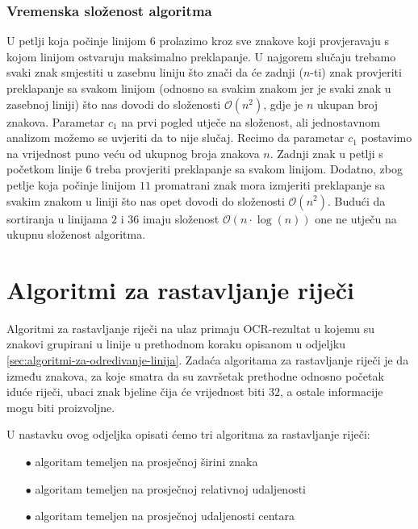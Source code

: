 \documentclass[times, utf8, zavrsni]{fer}
\begin{document}
\subsubsection{Vremenska složenost algoritma}
U petlji koja počinje linijom $6$ prolazimo kroz sve znakove koji provjeravaju
s kojom linijom ostvaruju maksimalno preklapanje. U najgorem slučaju trebamo
svaki znak smjestiti u zasebnu liniju što znači da će zadnji ($n$-ti) znak provjeriti preklapanje sa svakom linijom (odnosno sa svakim znakom jer je svaki znak u zasebnoj liniji) što nas dovodi do složenosti
$\mathcal{O}(n^2)$, gdje je $n$ ukupan broj znakova. Parametar $c_1$ na prvi
pogled utječe na složenost, ali jednostavnom analizom možemo se uvjeriti da to
nije slučaj. Recimo da parametar $c_1$ postavimo na vrijednost
puno veću od ukupnog broja znakova $n$. Zadnji znak u petlji s početkom
linije $6$ treba provjeriti preklapanje sa svakom linijom. Dodatno, zbog petlje
koja počinje linijom $11$ promatrani znak mora izmjeriti preklapanje sa svakim
znakom u liniji što nas opet dovodi do složenosti $\mathcal{O}(n^2)$.
Budući da sortiranja u linijama $2$ i $36$ imaju složenost
$\mathcal{O}(n \cdot \log(n))$ one ne utječu na ukupnu složenost algoritma.








\section{Algoritmi za rastavljanje riječi}
\label{sec:algoritmi-za-rastavljanje-riječi}
Algoritmi za rastavljanje riječi na ulaz primaju OCR-rezultat u kojemu su
znakovi grupirani u linije u prethodnom koraku opisanom u odjeljku
\ref{sec:algoritmi-za-odredivanje-linija}. Zadaća algoritama za rastavljanje
riječi je da između znakova, za koje smatra da su završetak prethodne odnosno
početak iduće riječi, ubaci znak bjeline čija će vrijednost  biti
$32$, a ostale informacije mogu biti proizvoljne.

U nastavku ovog odjeljka opisati ćemo tri algoritma za rastavljanje riječi:
\begin{itemize}
    \item[$\bullet$] algoritam temeljen na prosječnoj širini znaka
    \item[$\bullet$] algoritam temeljen na prosječnoj relativnoj
                     udaljenosti
    \item[$\bullet$] algoritam temeljen na prosječnoj udaljenosti centara
\end{itemize}
\end{document}
